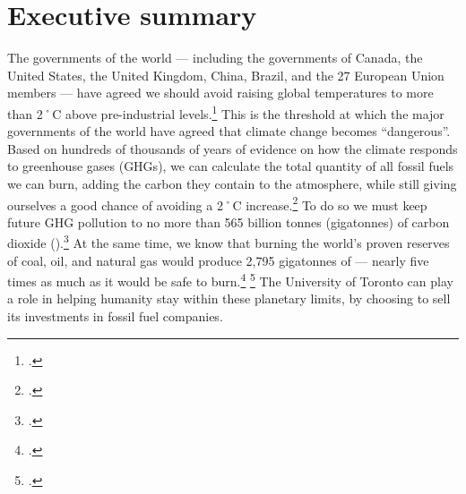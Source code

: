 

		\singlespacing
		\section{Executive summary}
		\label{sec:ExecutiveSummary}
		\doublespacing






The governments of the world --- including the governments of Canada, the United States, the United Kingdom, China, Brazil, and the 27 European Union members --- have agreed we should avoid raising global temperatures to more than 2˚C above pre-industrial levels.\footcite[][]{CopenhagenAccord}
This is the threshold at which the major governments of the world have agreed that climate change becomes ``dangerous''.
Based on hundreds of thousands of years of evidence on how the climate responds to greenhouse gases (GHGs), we can calculate the total quantity of all fossil fuels we can burn, adding the carbon they contain to the atmosphere, while still giving ourselves a good chance of avoiding a 2˚C increase.\footcite[Research published in \emph{Nature} highlights how even a limit of 2˚C of warming ``is not sufficient to control many other quantities, such as transient sea level rise5, ocean acidification and net primary production on land''. Limiting warming to a lesser level would require even more aggressive action than described in this brief.][p. 197]{Steinacher2013}
To do so we must keep future GHG pollution to no more than 565 billion tonnes (gigatonnes) of carbon dioxide ().\footcite[For an more detailed explanation that is accessible to non-experts see: ][]{TerrifyingNewMath}
At the same time, we know that burning the world's proven reserves of coal, oil, and natural gas would produce 2,795 gigatonnes of  --- nearly five times as much as it would be safe to burn.\footcite[][]{CTI2012} \footcite[Another accessible summary of the issue can be found in this free hour-long radio program: ][]{HotBackyard}
The University of Toronto can play a role in helping humanity stay within these planetary limits, by choosing to sell its investments in fossil fuel companies.



